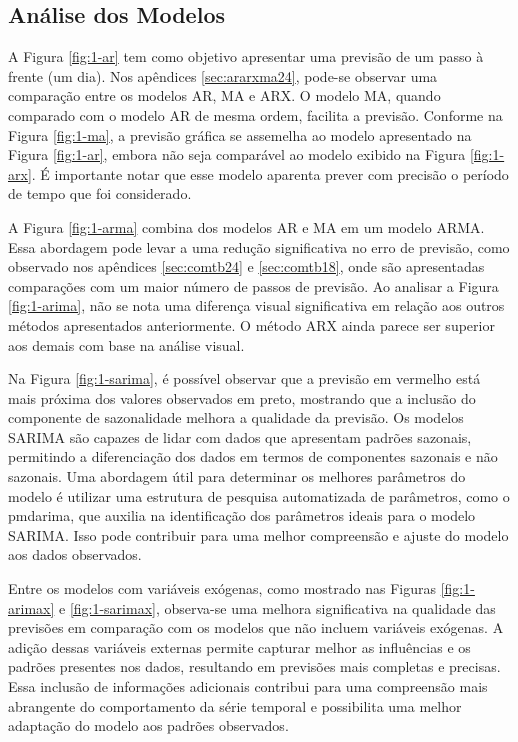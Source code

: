 \subsection{An\'alise dos Modelos}

A Figura \ref{fig:1-ar} tem como objetivo apresentar uma previsão de um passo à frente (um dia). Nos apêndices \ref{sec:ararxma24}, pode-se observar uma comparação entre os modelos AR, MA e ARX.
O modelo MA, quando comparado com o modelo AR de mesma ordem, facilita a previsão. Conforme na Figura \ref{fig:1-ma}, a previsão gráfica se assemelha ao modelo apresentado na Figura \ref{fig:1-ar}, embora não seja comparável ao modelo exibido na Figura \ref{fig:1-arx}. É importante notar que esse modelo aparenta prever com precisão o período de tempo que foi considerado.

A Figura \ref{fig:1-arma} combina dos modelos AR e MA em um modelo ARMA. Essa abordagem pode levar a uma redução significativa no erro de previsão, como observado nos apêndices \ref{sec:comtb24} e \ref{sec:comtb18}, onde são apresentadas comparações com um maior número de passos de previsão.
Ao analisar a Figura \ref{fig:1-arima}, não se nota uma diferença visual significativa em relação aos outros métodos apresentados anteriormente. O método ARX ainda parece ser superior aos demais com base na análise visual.

Na Figura \ref{fig:1-sarima}, é possível observar que a previsão em vermelho está mais próxima dos valores observados em preto, mostrando que a inclusão do componente de sazonalidade melhora a qualidade da previsão. Os modelos SARIMA são capazes de lidar com dados que apresentam padrões sazonais, permitindo a diferenciação dos dados em termos de componentes sazonais e não sazonais. Uma abordagem útil para determinar os melhores parâmetros do modelo é utilizar uma estrutura de pesquisa automatizada de parâmetros, como o pmdarima, que auxilia na identificação dos parâmetros ideais para o modelo SARIMA. Isso pode contribuir para uma melhor compreensão e ajuste do modelo aos dados observados.

Entre os modelos com variáveis exógenas, como mostrado nas Figuras \ref{fig:1-arimax} e \ref{fig:1-sarimax}, observa-se uma melhora significativa na qualidade das previsões em comparação com os modelos que não incluem variáveis exógenas. A adição dessas variáveis externas permite capturar melhor as influências e os padrões presentes nos dados, resultando em previsões mais completas e precisas. Essa inclusão de informações adicionais contribui para uma compreensão mais abrangente do comportamento da série temporal e possibilita uma melhor adaptação do modelo aos padrões observados.


